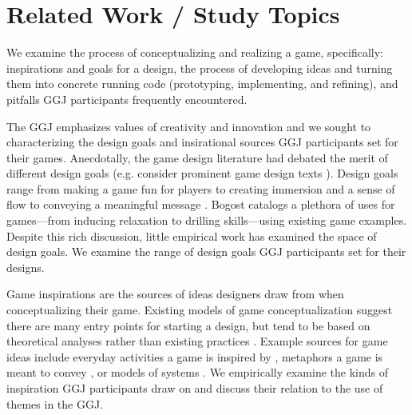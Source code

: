 \documentclass{sig-alternate}
\begin{document}



\section{Related Work / Study Topics}

We examine the process of conceptualizing and realizing a game, specifically: inspirations and goals for a design, the process of developing ideas and turning them into concrete running code (prototyping, implementing, and refining), and pitfalls GGJ participants frequently encountered.

The GGJ emphasizes values of creativity and innovation and we sought to characterizing the design goals and insirational sources GGJ participants set for their games. Anecdotally, the game design literature had debated the merit of different design goals (e.g. consider prominent game design texts \cite{fullerton2008:playcentric}\cite{salen2003:rulesplay} \cite{salen2006:reader} \cite{schell2008:gamedesign}). Design goals range from making a game fun for players \cite{koster2005:theory-fun} to creating immersion and a sense of flow \cite{fullerton2006:cloudgame} to conveying a meaningful message \cite{bogost2007:persuasive}. Bogost \cite{bogost2011:howto} catalogs a plethora of uses for games---from inducing relaxation to drilling skills---using existing game examples. Despite this rich discussion, little empirical work has examined the space of design goals. We examine the range of design goals GGJ participants set for their designs.

Game inspirations are the sources of ideas designers draw from when conceptualizing their game. Existing models of game conceptualization suggest there are many entry points for starting a design, but tend to be based on theoretical analyses rather than existing practices \cite{hunicke2004:mda}. Example sources for game ideas include everyday activities a game is inspired by \cite{treanor2010:kaboom}, metaphors a game is meant to convey \cite{rusch2008:game-metaphor}, or models of systems \cite{crawford1984:gamedesign}. We empirically examine the kinds of inspiration GGJ participants draw on and discuss their relation to the use of themes in the GGJ.
\end{document}
